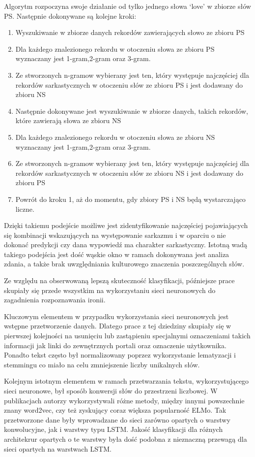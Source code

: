Algorytm rozpoczyna swoje działanie od tylko jednego słowa ‘love’ w zbiorze słów PS. Następnie dokonywane są kolejne kroki:
\begin{enumerate}
    \item Wyszukiwanie w zbiorze danych rekordów zawierających słowo ze zbioru PS
    \item Dla każdego znalezionego rekordu w otoczeniu słowa ze zbioru PS wyznaczany jest 1-gram,2-gram oraz 3-gram.
    \item Ze stworzonych n-gramow wybierany jest ten, który występuje najczęściej dla rekordów sarkastycznych w otoczeniu słów ze zbioru PS i jest dodawany do zbioru NS
    \item Następnie dokonywane jest wyszukiwanie w zbiorze danych, takich rekordów, które zawierają słowa ze zbioru NS
    \item Dla każdego znalezionego rekordu w otoczeniu słowa ze zbioru NS wyznaczany jest 1-gram,2-gram oraz 3-gram.
    \item Ze stworzonych n-gramow wybierany jest ten, który występuje najczęściej dla rekordów sarkastycznych w otoczeniu słów ze zbioru NS i jest dodawany do zbioru PS
    \item Powrót do kroku 1, aż do momentu, gdy zbiory PS i NS będą wystarczająco liczne.
\end{enumerate}




Dzięki takiemu podejście możliwe jest zidentyfikowanie najczęściej pojawiających się kombinacji wskazujących na występowanie sarkazmu i w oparciu o nie dokonać predykcji czy dana wypowiedź ma charakter sarkastyczny. Istotną wadą takiego podejścia jest dość wąskie okno w ramach dokonywana jest analiza zdania, a także brak uwzględniania kulturowego znaczenia poszczególnych słów.

Ze względu na obserwowaną lepszą skuteczność klasyfikacji, późniejsze prace skupiały się przede wszystkim na wykorzystaniu sieci neuronowych do zagadnienia rozpoznawania ironii.

Kluczowym elementem w przypadku wykorzystania sieci neuronowych jest wstępne przetworzenie danych. Dlatego prace \cite{Baziotis2018}  \cite{Huang2017}  \cite{Ilic2018} z tej dziedziny skupiały się w pierwszej kolejności na usunięciu lub zastąpieniu specjalnymi oznaczeniami takich informacji jak linki do zewnętrznych portali oraz oznaczenie użytkownika. Ponadto tekst często był normalizowany poprzez wykorzystanie lematyzacji i stemmingu co miało na celu zmniejszenie liczby unikalnych słów. 

Kolejnym istotnym elementem w ramach przetwarzania tekstu, wykorzystującego sieci neuronowe, był sposób konwersji słów do przestrzeni liczbowej. W publikacjach autorzy wykorzystywali różne metody, między innymi powszechnie znany word2vec, czy też zyskujący coraz większa popularność ELMo. Tak przetworzone dane były wprowadzane do sieci zarówno opartych o warstwy konwolucyjne, jak i warstwy typu LSTM. Jakość klasyfikacji dla różnych architekrur opartych o te warstwy była dość podobna z nieznaczną przewagą dla sieci opartych na warstwach LSTM.



